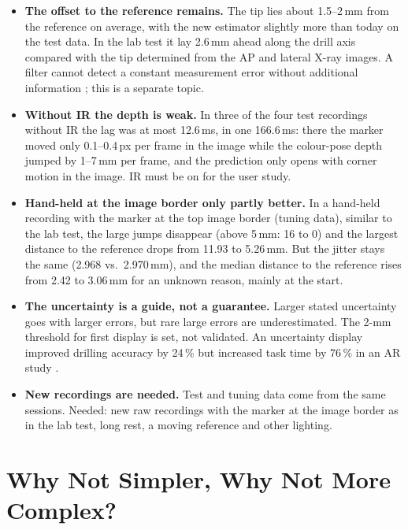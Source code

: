 \documentclass[11pt,a4paper,fleqn]{article}
\begin{document}
\begin{itemize}
  \item \textbf{The offset to the reference remains.} The tip lies about 1.5--2\,mm from the reference on average,
        with the new estimator slightly more than today on the test data. In the lab test it lay 2.6\,mm ahead along
        the drill axis compared with the tip determined from the AP and lateral X-ray images. A filter cannot detect
        a constant measurement error without additional information \cite[§5.1.3]{barfoot2017state}; this is a
        separate topic.
  \item \textbf{Without IR the depth is weak.} In three of the four test recordings without IR the lag was at most
        12.6\,ms, in one 166.6\,ms: there the marker moved only 0.1--0.4\,px per frame in the image while the
        colour-pose depth jumped by 1--7\,mm per frame, and the prediction only opens with corner motion in the
        image. IR must be on for the user study.
  \item \textbf{Hand-held at the image border only partly better.} In a hand-held recording with the marker at the
        top image border (tuning data), similar to the lab test, the large jumps disappear (above 5\,mm: 16 to 0) and
        the largest distance to the reference drops from 11.93 to 5.26\,mm. But the jitter stays the same (2.968 vs.\
        2.970\,mm), and the median distance to the reference rises from 2.42 to 3.06\,mm for an unknown reason,
        mainly at the start.
  \item \textbf{The uncertainty is a guide, not a guarantee.} Larger stated uncertainty goes with larger errors, but
        rare large errors are underestimated. The 2-mm threshold for first display is set, not validated. An
        uncertainty display improved drilling accuracy by 24\,\% but increased task time by 76\,\% in an AR study
        \cite{acherki2026visualization}.
  \item \textbf{New recordings are needed.} Test and tuning data come from the same sessions. Needed: new raw
        recordings with the marker at the image border as in the lab test, long rest, a moving reference and other
        lighting.
\end{itemize}

\section{Why Not Simpler, Why Not More Complex?}
\label{sec:alternatives}
\end{document}
